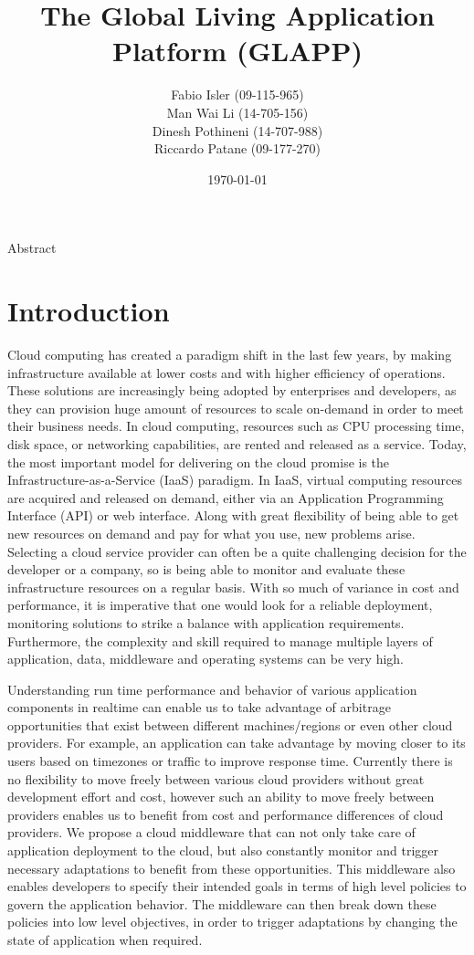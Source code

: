 \documentclass{seal_thesis}
\date{\today}
\title{The Global Living Application Platform (GLAPP)}
\subtitle{}
\author{
Fabio Isler \textmd{(09-115-965)} \\
Man Wai Li \textmd{(14-705-156)} \\
Dinesh Pothineni \textmd{(14-707-988)} \\
Riccardo Patane \textmd{(09-177-270)}}
\begin{document}
\maketitle

\abstract
Abstract


\chapter{Introduction}\label{ch:introduction}

Cloud computing has created a paradigm shift in the last few years, by making infrastructure available at lower costs and with higher efficiency of operations.
These solutions are increasingly being adopted by enterprises and developers, as they can provision huge amount of resources to scale on-demand in order to meet their business needs.
In cloud computing, resources such as CPU processing time, disk space, or networking capabilities, are rented and released as a service.
Today, the most important model for delivering on the cloud promise is the Infrastructure-as-a-Service (IaaS) paradigm.
In IaaS, virtual computing resources are acquired and released on demand, either via an Application Programming Interface (API) or web interface.
Along with great flexibility of being able to get new resources on demand and pay for what you use, new problems arise.
Selecting a cloud service provider can often be a quite challenging decision for the developer or a company, so is being able to monitor and evaluate these infrastructure resources on a regular basis.
With so much of variance in cost and performance, it is imperative that one would look for a reliable deployment, monitoring solutions to strike a balance with application requirements.
Furthermore, the complexity and skill required to manage multiple layers of application, data, middleware and operating systems can be very high.

Understanding run time performance and behavior of various application components in realtime can enable us to take advantage of arbitrage opportunities that exist between different machines/regions or even other cloud providers.
For example, an application can take advantage by moving closer to its users based on timezones or traffic to improve response time.
Currently there is no flexibility to move freely between various cloud providers without great development effort and cost, however such an ability to move freely between providers enables us to benefit from cost and performance differences of cloud providers.
We propose a cloud middleware that can not only take care of application deployment to the cloud, but also constantly monitor and trigger necessary adaptations to benefit from these opportunities.
This middleware also enables developers to specify their intended goals in terms of high level policies to govern the application behavior.
The middleware can then break down these policies into low level objectives, in order to trigger adaptations by changing the state of application when required.
\end{document}
